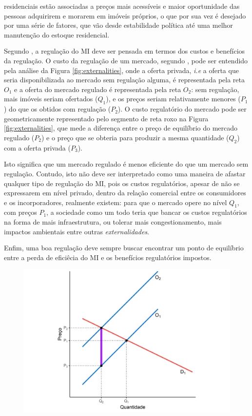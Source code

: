 \documentclass[
	12pt,				%
	oneside,			%
	a4paper,			%
	chapter=TITLE,		%
	section=TITLE,		%
	english,			%
	brazil				%
	]{abntex2}
\begin{document}
\begin{refsection}
\begin{enumerate}
  residenciais estão associadas a preços mais acessíveis e maior oportunidade das
  pessoas adquirirem e morarem em imóveis próprios, o que por sua vez é desejado
  por uma série de fatores, que vão desde estabilidade política até uma melhor
  manutenção do estoque residencial.
\end{enumerate}
Segundo \textcite[p.~209]{externalities}, a regulação do \gls{MI} deve ser pensada em
termos dos custos e benefícios da regulação. O custo da regulação de um mercado,
segundo \textcite{malpezzi_affordable_2018_4}, pode ser entendido pela análise da Figura
\ref{fig:externalities}, onde a oferta privada, \emph{i.e} a oferta que seria
disponibilizada ao mercado sem regulação alguma, é representada pela reta \(O_1\)
e a oferta do mercado regulado é representada pela reta \(O_2\): sem
regulação, mais imóveis seriam ofertados (\(Q_1\)), e os preços seriam
relativamente menores (\(P_1\)) do que os obtidos com regulação (\(P_2\)). O custo
regulatório do mercado pode ser geometricamente representado pelo segmento de
reta roxo na Figura \ref{fig:externalities}, que mede a diferença entre o preço
de equilíbrio do mercado regulado (\(P_2\)) e o preço que se obteria para produzir
a mesma quantidade (\(Q_2\)) com a oferta privada (\(P_3\)).

Isto significa que um mercado regulado é menos eficiente do que um mercado sem
regulação. Contudo, isto não deve ser interpretado como uma maneira de afastar
qualquer tipo de regulação do \gls{MI}, pois os custos regulatórios, apesar de
não se expressarem em nível privado, dentro da relação comercial entre os
consumidores e os incorporadores, realmente existem: para que o mercado opere
no nível \(Q_1\), com preços \(P_1\), a sociedade como um todo teria que bancar os
custos regulatórios na forma de mais infraestrutura, ou tolerar mais
congestionamento, mais impactos ambientais entre outras \emph{externalidades}.

Enfim, uma boa regulação deve sempre buscar encontrar um ponto de equilíbrio
entre a perda de eficiêcia do \gls{MI} e os benefícios regulatórios impostos.
\begin{figure}[H]

{\centering \includegraphics[width=0.7\linewidth]{images/externalities-1} 

}
\end{figure}
\end{refsection}
\end{document}
